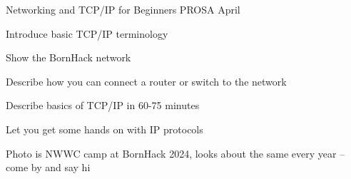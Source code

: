 \documentclass[Screen16to9,17pt]{foils}
\begin{document}





\mytitlepage
{Networking and TCP/IP for Beginners}
{PROSA April \the\year{}}



\hlkprofiluk



\begin{list2}
\item Introduce basic TCP/IP terminology
\item Show the BornHack network
\item Describe how you can connect a router or switch to the network
\item Describe basics of TCP/IP in 60-75 minutes
\item Let you get some hands on with IP protocols
\end{list2}

Photo is NWWC camp at BornHack 2024, looks about the same every year
--come by and say hi
\end{document}
